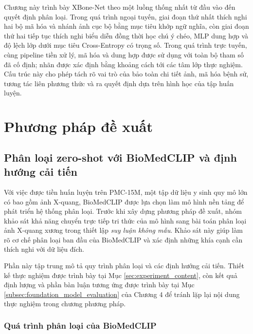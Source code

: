 Chương này trình bày XBone-Net theo một luồng thống nhất từ đầu vào đến quyết định phân loại. Trong quá trình ngoại tuyến, giai đoạn thứ nhất thích nghi hai bộ mã hóa và nhánh ảnh cục bộ bằng mục tiêu khớp ngữ nghĩa, còn giai đoạn thứ hai tiếp tục thích nghi biểu diễn đồng thời học chú ý chéo, MLP dung hợp và độ lệch lớp dưới mục tiêu Cross-Entropy có trọng số. Trong quá trình trực tuyến, cùng pipeline tiền xử lý, mã hóa và dung hợp được sử dụng với toàn bộ tham số đã cố định; nhãn được xác định bằng khoảng cách tới các tâm lớp thực nghiệm. Cấu trúc này cho phép tách rõ vai trò của bảo toàn chi tiết ảnh, mã hóa bệnh sử, tương tác liên phương thức và ra quyết định dựa trên hình học của tập huấn luyện.




\chapter{Phương pháp đề xuất}
\label{Chapter3}

\section{Phân loại zero-shot với BioMedCLIP và định hướng cải tiến}
\label{sec:ch3_biomedclip_baseline}

Với việc được tiền huấn luyện trên PMC-15M, một tập dữ liệu y sinh quy mô lớn có bao gồm ảnh X-quang, BioMedCLIP \cite{BiomedCLIP} được lựa chọn làm mô hình nền tảng để phát triển hệ thống phân loại. Trước khi xây dựng phương pháp đề xuất, nhóm khảo sát khả năng chuyển trực tiếp tri thức của mô hình sang bài toán phân loại ảnh X-quang xương trong thiết lập \textit{suy luận không mẫu}. Khảo sát này giúp làm rõ cơ chế phân loại ban đầu của BioMedCLIP và xác định những khía cạnh cần thích nghi với dữ liệu đích.

Phần này tập trung mô tả quy trình phân loại và các định hướng cải tiến. Thiết kế thực nghiệm được trình bày tại Mục \ref{sec:experiment_content}, còn kết quả định lượng và phần bàn luận tương ứng được trình bày tại Mục \ref{subsec:foundation_model_evaluation} của Chương 4 để tránh lặp lại nội dung thực nghiệm trong chương phương pháp.

\subsection{Quá trình phân loại của BioMedCLIP}
\label{subsec:ch3_biomedclip_classification}

